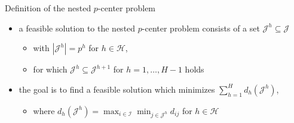 \documentclass[utf8,aspectratio=169,ngerman,english]{beamer}
\begin{document}
\begin{frame}[allowframebreaks]{Definition of the nested $p$-center problem}
    \begin{block}{\vspace*{-4ex}}
        \begin{itemize}
            \item a feasible solution to the nested $p$-center problem consists of a set $\mathcal J^h \subseteq \mathcal J$
            \begin{itemize}
                \item with $\left\lvert \mathcal J^h \right\rvert = p^h$ for $h \in \mathcal H$,
                \item for which $\mathcal J^h \subseteq \mathcal J^{h+1}$ for $h = 1, \dots, H-1$ holds
            \end{itemize}
            \item the goal is to find a feasible solution which minimizes $\sum_{h = 1}^{H} d_h(\mathcal J^h)$, 
            \begin{itemize}
                \item where $d_h(\mathcal J^h) = \max_{i \in \mathcal I}\min_{j \in \mathcal J^h} d_{ij}$ for $h \in \mathcal H$
            \end{itemize}
        \end{itemize}
    \end{block} 
\end{frame}
\end{document}
